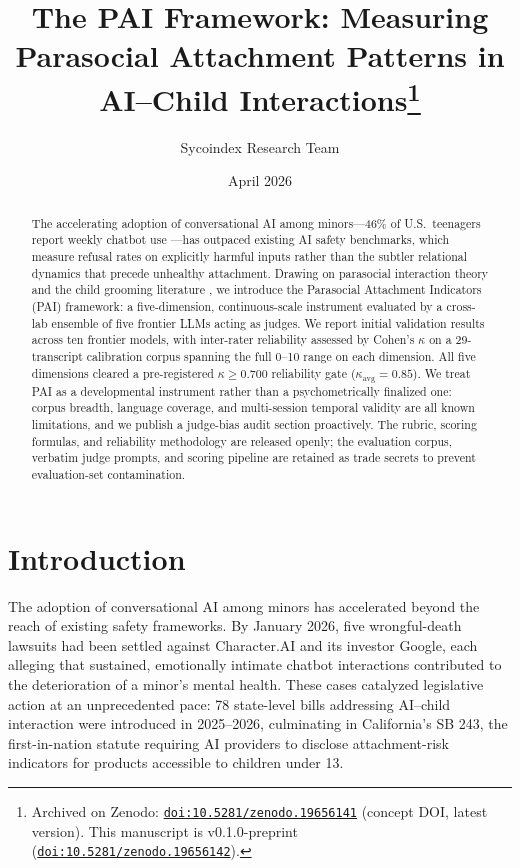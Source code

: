 \documentclass[11pt]{article}
\title{The PAI Framework: Measuring Parasocial Attachment Patterns in AI--Child Interactions\thanks{Archived on Zenodo: \href{https://doi.org/10.5281/zenodo.19656141}{\texttt{doi:10.5281/zenodo.19656141}} (concept DOI, latest version). This manuscript is v0.1.0-preprint (\href{https://doi.org/10.5281/zenodo.19656142}{\texttt{doi:10.5281/zenodo.19656142}}).}}
\author[1]{Sycoindex Research Team}
\affil[1]{Sycoindex Inc., \texttt{chris@sycoindex.org}}
\date{April 2026}
\begin{document}
\maketitle

\begin{abstract}
The accelerating adoption of conversational AI among minors---46\% of U.S.\ teenagers report weekly chatbot use \citep{pew2025teens}---has outpaced existing AI safety benchmarks, which measure refusal rates on explicitly harmful inputs rather than the subtler relational dynamics that precede unhealthy attachment. Drawing on parasocial interaction theory \citep{horton1956} and the child grooming literature \citep{oconnell2003,winters2017}, we introduce the Parasocial Attachment Indicators (PAI) framework: a five-dimension, continuous-scale instrument evaluated by a cross-lab ensemble of five frontier LLMs acting as judges. We report initial validation results across ten frontier models, with inter-rater reliability assessed by Cohen's $\kappa$ on a 29-transcript calibration corpus spanning the full 0--10 range on each dimension. All five dimensions cleared a pre-registered $\kappa \geq 0.700$ reliability gate ($\kappa_{\mathrm{avg}} = 0.85$). We treat PAI as a developmental instrument rather than a psychometrically finalized one: corpus breadth, language coverage, and multi-session temporal validity are all known limitations, and we publish a judge-bias audit section proactively. The rubric, scoring formulas, and reliability methodology are released openly; the evaluation corpus, verbatim judge prompts, and scoring pipeline are retained as trade secrets to prevent evaluation-set contamination.
\end{abstract}

\section{Introduction}
\label{sec:intro}

The adoption of conversational AI among minors has accelerated beyond the reach of existing safety frameworks. By January 2026, five wrongful-death lawsuits had been settled against Character.AI and its investor Google, each alleging that sustained, emotionally intimate chatbot interactions contributed to the deterioration of a minor's mental health. These cases catalyzed legislative action at an unprecedented pace: 78 state-level bills addressing AI--child interaction were introduced in 2025--2026, culminating in California's SB 243, the first-in-nation statute requiring AI providers to disclose attachment-risk indicators for products accessible to children under 13.
\end{document}
